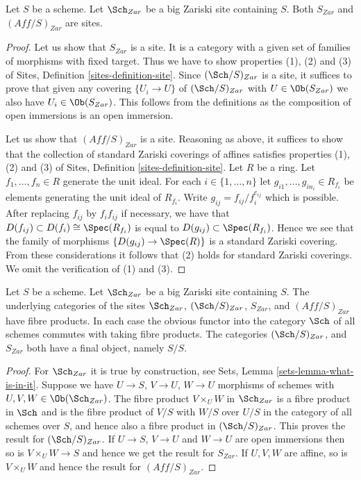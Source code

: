 \begin{lemma}
\label{lemma-verify-site-Zariski}
Let $S$ be a scheme. Let $\Sch_{Zar}$ be a big Zariski
site containing $S$.
Both $S_{Zar}$ and $(\textit{Aff}/S)_{Zar}$ are sites.
\end{lemma}

\begin{proof}
Let us show that $S_{Zar}$ is a site. It is a category with a
given set of families of morphisms with fixed target. Thus we
have to show properties (1), (2) and (3) of
Sites, Definition \ref{sites-definition-site}.
Since $(\Sch/S)_{Zar}$ is a site, it suffices to prove
that given any covering $\{U_i \to U\}$ of $(\Sch/S)_{Zar}$
with $U \in \Ob(S_{Zar})$ we also have $U_i \in \Ob(S_{Zar})$.
This follows from the definitions
as the composition of open immersions is an open immersion.

\medskip\noindent
Let us show that $(\textit{Aff}/S)_{Zar}$ is a site.
Reasoning as above, it suffices to show that the collection
of standard Zariski coverings of affines satisfies properties
(1), (2) and (3) of
Sites, Definition \ref{sites-definition-site}.
Let $R$ be a ring. Let $f_1, \ldots, f_n \in R$ generate the unit ideal.
For each $i \in \{1, \ldots, n\}$ let $g_{i1}, \ldots, g_{in_i} \in R_{f_i}$
be elements generating the unit ideal of $R_{f_i}$. Write
$g_{ij} = f_{ij}/f_i^{e_{ij}}$ which is possible. After replacing
$f_{ij}$ by $f_i f_{ij}$ if necessary, we have that
$D(f_{ij}) \subset D(f_i) \cong \Spec(R_{f_i})$ is
equal to $D(g_{ij}) \subset \Spec(R_{f_i})$. Hence we see that
the family of morphisms $\{D(g_{ij}) \to \Spec(R)\}$
is a standard Zariski covering. From these considerations
it follows that (2) holds for standard Zariski coverings.
We omit the verification of (1) and (3).
\end{proof}

\begin{lemma}
\label{lemma-fibre-products-Zariski}
Let $S$ be a scheme. Let $\Sch_{Zar}$ be a big Zariski
site containing $S$. The underlying categories of the sites
$\Sch_{Zar}$, $(\Sch/S)_{Zar}$,
$S_{Zar}$, and $(\textit{Aff}/S)_{Zar}$ have fibre products.
In each case the obvious functor into the category $\Sch$ of
all schemes commutes with taking fibre products. The categories
$(\Sch/S)_{Zar}$, and $S_{Zar}$ both have a final object,
namely $S/S$.
\end{lemma}

\begin{proof}
For $\Sch_{Zar}$ it is true by construction, see
Sets, Lemma \ref{sets-lemma-what-is-in-it}.
Suppose we have $U \to S$, $V \to U$, $W \to U$ morphisms
of schemes with $U, V, W \in \Ob(\Sch_{Zar})$.
The fibre product $V \times_U W$ in $\Sch_{Zar}$
is a fibre product in $\Sch$ and
is the fibre product of $V/S$ with $W/S$ over $U/S$ in
the category of all schemes over $S$, and hence also a
fibre product in $(\Sch/S)_{Zar}$.
This proves the result for $(\Sch/S)_{Zar}$.
If $U \to S$, $V \to U$ and $W \to U$ are open immersions then so is
$V \times_U W \to S$ and hence we get the result for $S_{Zar}$.
If $U, V, W$ are affine, so is $V \times_U W$ and hence the
result for $(\textit{Aff}/S)_{Zar}$.
\end{proof}

